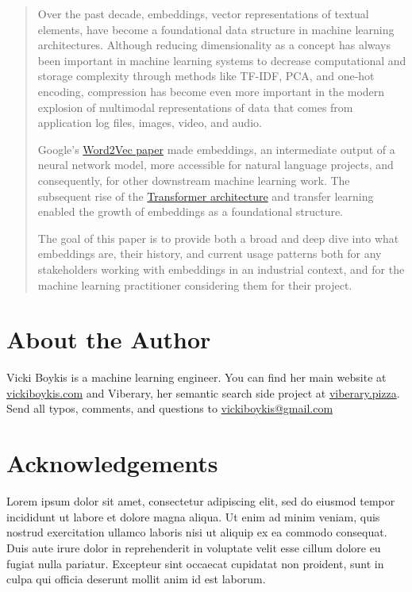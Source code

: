 \documentclass[draft, 11pt]{diazessay} %
\begin{document}
\begin{abstract}
Over the past decade, embeddings, vector representations of textual elements, have become a foundational data structure in machine learning architectures. Although reducing dimensionality as a concept has always been important in machine learning systems to decrease computational and storage complexity through methods like TF-IDF, PCA, and one-hot encoding, compression has become even more important in the modern explosion of multimodal representations of data that comes from application log files, images, video, and audio. 

Google's \href{https://arxiv.org/abs/1301.3781}{Word2Vec paper} made embeddings, an intermediate output of a neural network model, more accessible for natural language projects, and consequently, for other downstream machine learning work. The subsequent rise of the \href{https://arxiv.org/abs/1706.03762}{Transformer architecture} and transfer learning enabled the growth of embeddings as a foundational structure. 

The goal of this paper is to provide both a broad and deep dive into what embeddings are, their history, and current usage patterns both for any stakeholders working with embeddings in an industrial context, and for the machine learning practitioner considering them for their project. 

\end{abstract}

\section*{About the Author}

Vicki Boykis is a machine learning engineer. You can find her main website at \href{https://www.vickiboykis.com}{vickiboykis.com} and Viberary, her semantic search side project at \href{https://www.viberary.pizza}{viberary.pizza}. Send all typos, comments, and questions to \href{mailto:vickiboykis@gmail.com}{vickiboykis@gmail.com}


\section*{Acknowledgements}
Lorem ipsum dolor sit amet, consectetur adipiscing elit, sed do eiusmod tempor incididunt ut labore et dolore magna aliqua. Ut enim ad minim veniam, quis nostrud exercitation ullamco laboris nisi ut aliquip ex ea commodo consequat. Duis aute irure dolor in reprehenderit in voluptate velit esse cillum dolore eu fugiat nulla pariatur. Excepteur sint occaecat cupidatat non proident, sunt in culpa qui officia deserunt mollit anim id est laborum.
\end{document}
